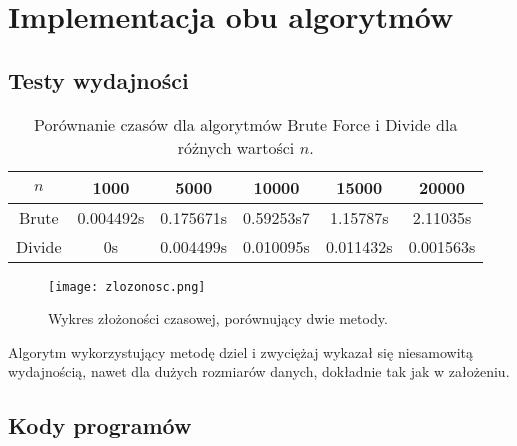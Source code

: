 \documentclass[12pt,twoside]{article}
\begin{document}
\section{Implementacja obu algorytmów}
\subsection{Testy wydajności}
\begin{table}[h!]
    \centering
    \begin{tabular}{|c|c|c|c|c|c|}
    \hline
    $n$ & 1000 & 5000 & 10000 & 15000 & 20000 \\ \hline
    Brute & 0.004492s & 0.175671s & 0.59253s7 & 1.15787s & 2.11035s \\ \hline
    Divide & 0s & 0.004499s & 0.010095s & 0.011432s & 0.001563s \\ \hline
    \end{tabular}
    \caption{Porównanie czasów dla algorytmów Brute Force i Divide dla różnych wartości $n$.}
    \label{tab:porownanie}
\end{table}

\begin{figure}[h!]
    \centering
    \texttt{[image: zlozonosc.png]}
    \caption{\label{fig:zlozonosc}Wykres złożoności czasowej, porównujący dwie metody.}
\end{figure}

Algorytm wykorzystujący metodę dziel i zwyciężaj wykazał się niesamowitą wydajnością, nawet dla dużych rozmiarów danych, dokładnie tak jak w założeniu.



\clearpage
\subsection{Kody programów}
\end{document}
